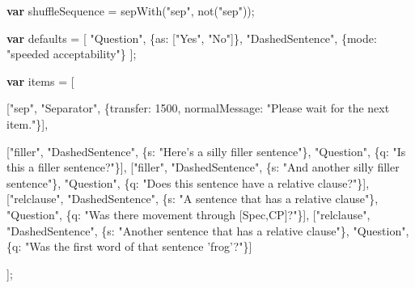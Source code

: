 \documentclass[]{article}
\newenvironment{Shaded}{}{}
\newcommand{\KeywordTok}[1]{\textcolor[rgb]{0.00,0.44,0.13}{\textbf{{#1}}}}
\newcommand{\DataTypeTok}[1]{\textcolor[rgb]{0.56,0.13,0.00}{{#1}}}
\newcommand{\DecValTok}[1]{\textcolor[rgb]{0.25,0.63,0.44}{{#1}}}
\newcommand{\StringTok}[1]{\textcolor[rgb]{0.25,0.44,0.63}{{#1}}}
\newcommand{\FunctionTok}[1]{\textcolor[rgb]{0.02,0.16,0.49}{{#1}}}
\newcommand{\NormalTok}[1]{{#1}}
\begin{document}
\begin{Shaded}
\begin{Highlighting}[]
    \KeywordTok{var} \NormalTok{shuffleSequence = }\FunctionTok{sepWith}\NormalTok{(}\StringTok{"sep"}\NormalTok{, }\FunctionTok{not}\NormalTok{(}\StringTok{"sep"}\NormalTok{));}

    \KeywordTok{var} \NormalTok{defaults = [}
        \StringTok{"Question"}\NormalTok{, \{}\DataTypeTok{as}\NormalTok{: [}\StringTok{"Yes"}\NormalTok{, }\StringTok{"No"}\NormalTok{]\},}
        \StringTok{"DashedSentence"}\NormalTok{, \{}\DataTypeTok{mode}\NormalTok{: }\StringTok{"speeded acceptability"}\NormalTok{\}}
    \NormalTok{];}

    \KeywordTok{var} \NormalTok{items = [}

    \NormalTok{[}\StringTok{"sep"}\NormalTok{, }\StringTok{"Separator"}\NormalTok{, \{}\DataTypeTok{transfer}\NormalTok{: }\DecValTok{1500}\NormalTok{, }\DataTypeTok{normalMessage}\NormalTok{: }\StringTok{"Please wait for the next item."}\NormalTok{\}],}

    \NormalTok{[}\StringTok{"filler"}\NormalTok{, }\StringTok{"DashedSentence"}\NormalTok{, \{}\DataTypeTok{s}\NormalTok{: }\StringTok{"Here's a silly filler sentence"}\NormalTok{\},}
               \StringTok{"Question"}\NormalTok{, \{}\DataTypeTok{q}\NormalTok{: }\StringTok{"Is this a filler sentence?"}\NormalTok{\}],}
    \NormalTok{[}\StringTok{"filler"}\NormalTok{, }\StringTok{"DashedSentence"}\NormalTok{, \{}\DataTypeTok{s}\NormalTok{: }\StringTok{"And another silly filler sentence"}\NormalTok{\},}
               \StringTok{"Question"}\NormalTok{, \{}\DataTypeTok{q}\NormalTok{: }\StringTok{"Does this sentence have a relative clause?"}\NormalTok{\}],}
    \NormalTok{[}\StringTok{"relclause"}\NormalTok{, }\StringTok{"DashedSentence"}\NormalTok{, \{}\DataTypeTok{s}\NormalTok{: }\StringTok{"A sentence that has a relative clause"}\NormalTok{\},}
                  \StringTok{"Question"}\NormalTok{, \{}\DataTypeTok{q}\NormalTok{: }\StringTok{"Was there movement through [Spec,CP]?"}\NormalTok{\}],}
    \NormalTok{[}\StringTok{"relclause"}\NormalTok{, }\StringTok{"DashedSentence"}\NormalTok{, \{}\DataTypeTok{s}\NormalTok{: }\StringTok{"Another sentence that has a relative clause"}\NormalTok{\},}
                  \StringTok{"Question"}\NormalTok{, \{}\DataTypeTok{q}\NormalTok{: }\StringTok{"Was the first word of that sentence 'frog'?"}\NormalTok{\}]}

    \NormalTok{];}
\end{Highlighting}
\end{Shaded}
\end{document}
